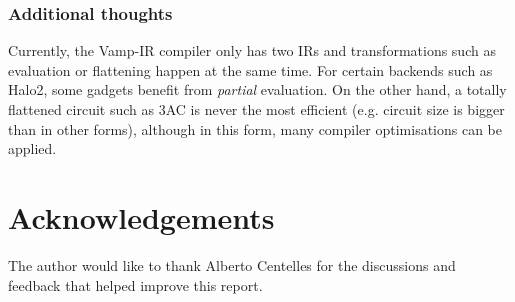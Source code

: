 \documentclass[
    9pt,            %
    techreport,        %
    affiltop,       %
]{art}
\begin{document}
\subsubsection{Additional thoughts}

Currently, the Vamp-IR compiler only has two IRs and transformations such as evaluation or flattening happen at the same time. For certain backends such as Halo2, some gadgets benefit from \textit{partial} evaluation. On the other hand, a totally flattened circuit such as 3AC is never the most efficient (e.g. circuit size is bigger than in other forms), although in this form, many compiler optimisations can be applied.




\section*{Acknowledgements}

    The author would like to thank Alberto Centelles for the discussions and 
    feedback that helped improve this report.


\end{document}
